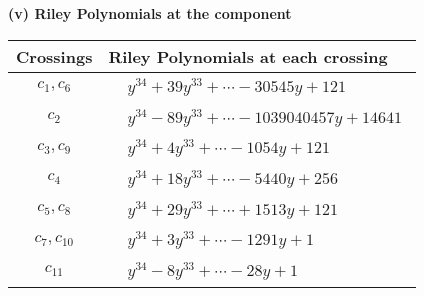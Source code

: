 \documentclass[1p]{elsarticle_modified}
\theoremstyle{definition}
\begin{document}
\flushleft \textbf{(v) Riley Polynomials at the component}\newline \\
\begin{tabular}{m{50pt}|m{274pt}}
Crossings & \hspace{64pt}Riley Polynomials at each crossing \\
\hline $$\begin{aligned}c_{1},c_{6}\end{aligned}$$&$\begin{aligned}
&y^{34}+39 y^{33}+\cdots-30545 y+121
\end{aligned}$\\
\hline $$\begin{aligned}c_{2}\end{aligned}$$&$\begin{aligned}
&y^{34}-89 y^{33}+\cdots-1039040457 y+14641
\end{aligned}$\\
\hline $$\begin{aligned}c_{3},c_{9}\end{aligned}$$&$\begin{aligned}
&y^{34}+4 y^{33}+\cdots-1054 y+121
\end{aligned}$\\
\hline $$\begin{aligned}c_{4}\end{aligned}$$&$\begin{aligned}
&y^{34}+18 y^{33}+\cdots-5440 y+256
\end{aligned}$\\
\hline $$\begin{aligned}c_{5},c_{8}\end{aligned}$$&$\begin{aligned}
&y^{34}+29 y^{33}+\cdots+1513 y+121
\end{aligned}$\\
\hline $$\begin{aligned}c_{7},c_{10}\end{aligned}$$&$\begin{aligned}
&y^{34}+3 y^{33}+\cdots-1291 y+1
\end{aligned}$\\
\hline $$\begin{aligned}c_{11}\end{aligned}$$&$\begin{aligned}
&y^{34}-8 y^{33}+\cdots-28 y+1
\end{aligned}$\\
\hline
\end{tabular}\\~\\
\end{document}
